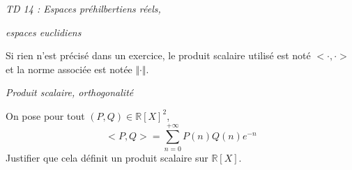 \documentclass[a4paper,10pt]{report}
\begin{document}
\everymath{\displaystyle}


\begin{center}
\textit{{ {\huge TD 14 : Espaces préhilbertiens réels, }}}

\textit{{ {\huge espaces euclidiens}}}
\end{center}

\bigskip

\noindent Si rien n'est précisé dans un exercice, le produit scalaire utilisé est noté $< \cdot , \cdot >$ et la norme associée est notée $\Vert \cdot \Vert$.


\medskip

\begin{center}
\textit{{ {\large Produit scalaire, orthogonalité}}}
\end{center}

\medskip

\begin{Exercice}{} On pose pour tout $(P,Q) \in \mathbb{R}[X]^2$,
$$ <P,Q> = \sum_{n=0}^{+ \infty} P(n) Q(n) e^{-n} $$
Justifier que cela définit un produit scalaire sur $\mathbb{R}[X]$.
\end{Exercice}

%
%
%
\end{document}
